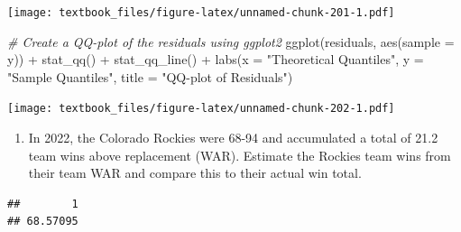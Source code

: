 \documentclass[
  11pt,
]{book}
\newenvironment{Shaded}{\begin{snugshade}}{\end{snugshade}}
\newcommand{\AttributeTok}[1]{\textcolor[rgb]{0.77,0.63,0.00}{#1}}
\newcommand{\CommentTok}[1]{\textcolor[rgb]{0.56,0.35,0.01}{\textit{#1}}}
\newcommand{\FloatTok}[1]{\textcolor[rgb]{0.00,0.00,0.81}{#1}}
\newcommand{\FunctionTok}[1]{\textcolor[rgb]{0.00,0.00,0.00}{#1}}
\newcommand{\NormalTok}[1]{#1}
\newcommand{\OtherTok}[1]{\textcolor[rgb]{0.56,0.35,0.01}{#1}}
\newcommand{\SpecialCharTok}[1]{\textcolor[rgb]{0.00,0.00,0.00}{#1}}
\newcommand{\StringTok}[1]{\textcolor[rgb]{0.31,0.60,0.02}{#1}}
\providecommand{\tightlist}{%
  \setlength{\itemsep}{0pt}\setlength{\parskip}{0pt}}
\theoremstyle{definition}
\theoremstyle{definition}
\theoremstyle{definition}
\theoremstyle{definition}
\theoremstyle{remark}
\begin{document}
\texttt{[image: textbook\_files/figure-latex/unnamed-chunk-201-1.pdf]}

\newpage

\begin{Shaded}
\begin{Highlighting}[]
\CommentTok{\# Create a QQ{-}plot of the residuals using ggplot2}
\FunctionTok{ggplot}\NormalTok{(residuals, }\FunctionTok{aes}\NormalTok{(}\AttributeTok{sample =}\NormalTok{ y)) }\SpecialCharTok{+}
  \FunctionTok{stat\_qq}\NormalTok{() }\SpecialCharTok{+}
  \FunctionTok{stat\_qq\_line}\NormalTok{() }\SpecialCharTok{+}
  \FunctionTok{labs}\NormalTok{(}\AttributeTok{x =} \StringTok{"Theoretical Quantiles"}\NormalTok{, }\AttributeTok{y =} \StringTok{"Sample Quantiles"}\NormalTok{, }\AttributeTok{title =} \StringTok{"QQ{-}plot of Residuals"}\NormalTok{)}
\end{Highlighting}
\end{Shaded}

\texttt{[image: textbook\_files/figure-latex/unnamed-chunk-202-1.pdf]}

\newpage

\begin{enumerate}
\def\labelenumi{(\alph{enumi})}
\setcounter{enumi}{4}
\tightlist
\item
  In 2022, the Colorado Rockies were 68-94 and accumulated a total of 21.2 team wins above replacement (WAR). Estimate the Rockies team wins from their team WAR and compare this to their actual win total.
\end{enumerate}

\begin{Shaded}
\end{Shaded}

\begin{verbatim}
##        1 
## 68.57095
\end{verbatim}
\end{document}
